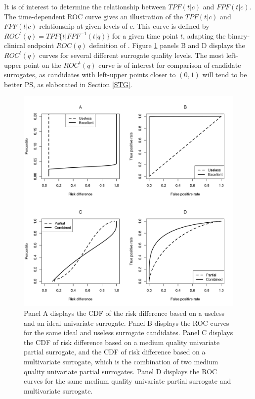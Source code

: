 \documentclass[times, doublespace]{simauth}
\begin{document}
It is of interest to determine the relationship between $TPF(t|c)$ and $FPF(t|c)$. The time-dependent ROC curve gives an illustration of the $TPF(t|c)$ and $FPF(t|c)$ relationship at given levels of $c$. This curve is defined by $ROC^{t}(q)=TPF\{t|FPF^{-1}(t|q)\}$ for a given time point $t$, adapting the binary-clinical endpoint $ROC(q)$ definition of \citet{Huang12b}. Figure \ref{4panel} panels B and D displays the $ROC^{t}(q)$ curves for several different surrogate quality levels. The most left-upper point on the $ROC^{t}(q)$ curve is of interest for comparison of candidate surrogates, as candidates with left-upper points closer to $(0,1)$ will tend to be better PS, as elaborated in Section \ref{STG}.
\begin{figure}
\begin{center}
\includegraphics[scale=0.80]{Figure1.jpeg}
\end{center}
\caption{Panel A displays the CDF of the risk difference based on a useless and an ideal univariate surrogate. Panel B displays the ROC curves for the same ideal and useless surrogate candidates. Panel C displays the CDF of risk difference based on a medium quality univariate partial surrogate, and the CDF of risk difference based on a multivariate surrogate, which is the combination of two medium quality univariate partial surrogates. Panel D displays the ROC curves for the same medium quality univariate partial surrogate and multivariate surrogate. \label{4panel}}
\end{figure}
\end{document}
